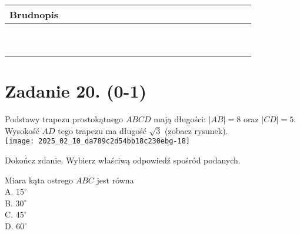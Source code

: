 \documentclass[10pt]{article}
\begin{document}
\begin{center}
\begin{tabular}{|c|c|c|c|c|c|c|c|c|c|c|c|c|c|c|c|c|c|c|c|c|c|c|c|}
\hline
\multicolumn{4}{|l|}{Brudnopis} &  &  &  &  &  &  &  &  &  &  &  &  &  &  &  &  &  &  &  &  \\
\hline
 &  &  &  &  &  &  &  &  &  &  &  &  &  &  &  &  &  &  &  &  &  &  &  \\
\hline
 &  &  &  &  &  &  &  &  &  &  &  &  &  &  &  &  &  &  &  &  &  &  &  \\
\hline
 &  &  &  &  &  &  &  &  &  &  &  &  &  &  &  &  &  &  &  &  &  &  &  \\
\hline
 &  &  &  &  &  &  &  &  &  &  &  &  &  &  &  &  &  &  &  &  &  &  &  \\
\hline
 &  &  &  &  &  &  &  &  &  &  &  &  &  &  &  &  &  &  &  &  &  &  &  \\
\hline
 &  &  &  &  &  &  &  &  &  &  &  &  &  &  &  &  &  &  &  &  &  &  &  \\
\hline
 &  &  &  &  &  &  &  &  &  &  &  &  &  &  &  &  &  &  &  &  &  &  &  \\
\hline
 &  &  &  &  &  &  &  &  &  &  &  &  &  &  &  &  &  &  &  &  &  &  &  \\
\hline
 &  &  &  &  &  &  &  &  &  &  &  &  &  &  &  &  &  &  &  &  &  &  &  \\
\hline
\end{tabular}
\end{center}

\section*{Zadanie 20. (0-1)}
Podstawy trapezu prostokątnego \(A B C D\) mają długości: \(|A B|=8\) oraz \(|C D|=5\).\\
Wysokość \(A D\) tego trapezu ma długość \(\sqrt{3}\) (zobacz rysunek).\\
\texttt{[image: 2025\_02\_10\_da789c2d54bb18c230ebg-18]}

Dokończ zdanie. Wybierz właściwą odpowiedź spośród podanych.

Miara kąta ostrego \(A B C\) jest równa\\
A. \(15^{\circ}\)\\
B. \(30^{\circ}\)\\
C. \(45^{\circ}\)\\
D. \(60^{\circ}\)
\end{document}
